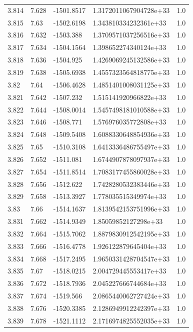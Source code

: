 \begin{tabular}{lllll}
3.814 & 7.628 & -1501.8517 & 1.3172011067904728e+33 & 1.0 \\
3.815 & 7.63 & -1502.6198 & 1.343810334232361e+33 & 1.0 \\
3.816 & 7.632 & -1503.388 & 1.3709571037256516e+33 & 1.0 \\
3.817 & 7.634 & -1504.1564 & 1.398652274340124e+33 & 1.0 \\
3.818 & 7.636 & -1504.925 & 1.4269069245132586e+33 & 1.0 \\
3.819 & 7.638 & -1505.6938 & 1.4557323564818775e+33 & 1.0 \\
3.82 & 7.64 & -1506.4628 & 1.4851401008031125e+33 & 1.0 \\
3.821 & 7.642 & -1507.232 & 1.515141920966822e+33 & 1.0 \\
3.822 & 7.644 & -1508.0014 & 1.5457498181010588e+33 & 1.0 \\
3.823 & 7.646 & -1508.771 & 1.576976035772808e+33 & 1.0 \\
3.824 & 7.648 & -1509.5408 & 1.6088330648854936e+33 & 1.0 \\
3.825 & 7.65 & -1510.3108 & 1.6413336486755497e+33 & 1.0 \\
3.826 & 7.652 & -1511.081 & 1.6744907878097937e+33 & 1.0 \\
3.827 & 7.654 & -1511.8514 & 1.7083177455860028e+33 & 1.0 \\
3.828 & 7.656 & -1512.622 & 1.7428280532383446e+33 & 1.0 \\
3.829 & 7.658 & -1513.3927 & 1.778035515349974e+33 & 1.0 \\
3.83 & 7.66 & -1514.1637 & 1.8139542153751996e+33 & 1.0 \\
3.831 & 7.662 & -1514.9349 & 1.85059852127298e+33 & 1.0 \\
3.832 & 7.664 & -1515.7062 & 1.8879830912542195e+33 & 1.0 \\
3.833 & 7.666 & -1516.4778 & 1.926122879645404e+33 & 1.0 \\
3.834 & 7.668 & -1517.2495 & 1.9650331428704547e+33 & 1.0 \\
3.835 & 7.67 & -1518.0215 & 2.004729445553417e+33 & 1.0 \\
3.836 & 7.672 & -1518.7936 & 2.045227666744684e+33 & 1.0 \\
3.837 & 7.674 & -1519.566 & 2.0865440062727424e+33 & 1.0 \\
3.838 & 7.676 & -1520.3385 & 2.1286949912242397e+33 & 1.0 \\
3.839 & 7.678 & -1521.1112 & 2.1716974825552035e+33 & 1.0 \\

\end{tabular}
